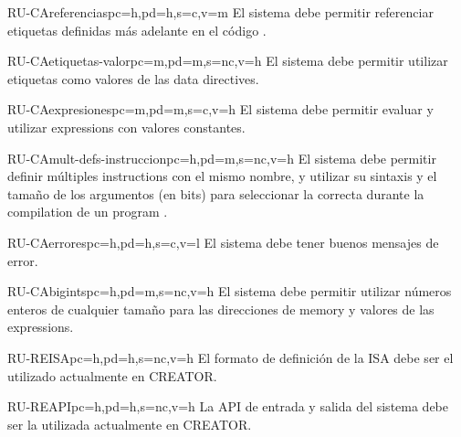 \begin{userReq}{RU-CA}{referencias}{pc=h,pd=h,s=c,v=m}
    El sistema debe permitir referenciar etiquetas definidas más adelante en el
    código .
\end{userReq}

\begin{userReq}{RU-CA}{etiquetas-valor}{pc=m,pd=m,s=nc,v=h}
    El sistema debe permitir utilizar etiquetas como valores de las \glspl{data directive}.
\end{userReq}

\begin{userReq}{RU-CA}{expresiones}{pc=m,pd=m,s=c,v=h}
    El sistema debe permitir evaluar y utilizar \glspl{expression} con valores
    constantes.
\end{userReq}

\begin{userReq}{RU-CA}{mult-defs-instruccion}{pc=h,pd=m,s=nc,v=h}
    El sistema debe permitir definir múltiples \glspl{instruction} con el mismo
    nombre, y utilizar su sintaxis y el tamaño de los argumentos (en bits) para
    seleccionar la correcta durante la \gls{compilation} de un \gls{program}
    .
\end{userReq}

\begin{userReq}{RU-CA}{errores}{pc=h,pd=h,s=c,v=l}
    El sistema debe tener buenos mensajes de error.
\end{userReq}

\begin{userReq}{RU-CA}{bigints}{pc=h,pd=m,s=nc,v=h}
    El sistema debe permitir utilizar números enteros de cualquier tamaño para
    las direcciones de \gls{memory} y valores de las \glspl{expression}.
\end{userReq}


\begin{userReq}{RU-RE}{ISA}{pc=h,pd=h,s=nc,v=h}
    El formato de definición de la \gls{ISA} debe ser el utilizado
    actualmente en CREATOR.
\end{userReq}

\begin{userReq}{RU-RE}{API}{pc=h,pd=h,s=nc,v=h}
    La \gls{API} de entrada y salida del sistema debe ser la utilizada
    actualmente en CREATOR.
\end{userReq}

